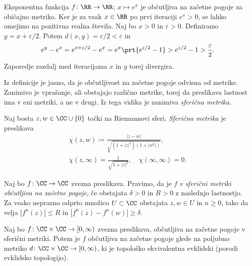 \begin{primer}
    Eksponentna funkcija \(f \colon \RR \to \RR\); \(x \mapsto e^x\) je občutljiva na začetne pogoje za običajno metriko. Ker je za vsak \(x \in \RR\) po prvi iteraciji \(e^x > 0\), se lahko omejimo na pozitivna realna števila. Naj bo \(x > 0\) in \(\varepsilon > 0\). Definiramo \(y = x + \varepsilon / 2\). Potem \(d (x, y) = \varepsilon / 2 < \varepsilon\) in
    \[e^{y} - e^{x} = e^{x + \varepsilon / 2} - e^x = e^x \prt{e^{\varepsilon / 2} - 1} > e^{\varepsilon / 2} - 1 > \frac{\varepsilon}{2}.\]
    Zaporedje razdalj med iteracijama \(x\) in \(y\) torej divergira.
\end{primer}

\noindent Iz definicije je jasno, da je občutljivost na začetne pogoje odvisna od metrike. Zanimivo je vprašanje, ali obstajajo različno metrike, torej da preslikava lastnost ima v eni metriki, a ne v drugi. Iz tega vidika je zanimiva \emph{sferična metrika}.

\begin{definicija}
    Naj bosta \(z, w \in \CC \cup \{0\}\) točki na Riemannovi sferi. \emph{Sferična metrika} je preslikava
    \begin{align*}
        \chi (z, w) \coloneq \frac{|z - w|}{\sqrt{(1 + |z|^2) (1 + |w^2|)}},\\
        \chi (z, \infty) = \frac{1}{\sqrt{1 + |z|^2}}, \quad \chi (\infty, \infty) = 0.
    \end{align*}
\end{definicija}

\begin{definicija}
    Naj bo \(f \colon \CC \to \CC\) zvezna preslikava. Pravimo, da je \(f\) \emph{v sferični metriki občutljiva na začetne pogoje}, če obstajata \(\delta > 0\) in \(R > 0\) z naslednjo lastnostjo. Za vsako neprazno odprto množico \(U \subset \CC\) obstajata \(z, w \in U\) in \(n \geq 0\), tako da velja \(|f^n (z)| \leq R\) in \(|f^n (z) - f^n (w)| \geq \delta\).
\end{definicija}

\begin{trditev}
    Naj bo \(f \colon \CC \times \CC \to [0, \infty)\) zvezna preslikava, občutljiva na začetne pogoje v sferični metriki. Potem je \(f\) občutljiva na začetne pogoje glede na poljubno metriko \(d \colon \CC \times \CC \to [0, \infty)\), ki je topološko ekvivalentna evklidski (porodi evklidsko topologijo).
\end{trditev}
